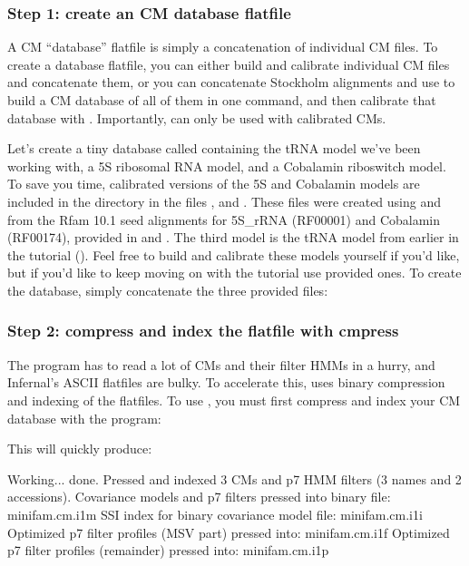 \subsubsection{Step 1: create an CM database flatfile}

A CM ``database'' flatfile is simply a concatenation of individual CM
files. To create a database flatfile, you can either build and
calibrate individual CM files and concatenate them, or you can
concatenate Stockholm alignments and use  to build a CM
database of all of them in one command, and then calibrate that
database with . Importantly,  can only
be used with calibrated CMs.

Let's create a tiny database called  containing the
tRNA model we've been working with, a 5S ribosomal RNA model, and a
Cobalamin riboswitch model. To save you time, calibrated versions of
the 5S and Cobalamin models are included in the 
directory in the files , and
. These files were created using 
and  from the Rfam 10.1 seed alignments for 5S\_rRNA
(RF00001) and Cobalamin (RF00174), provided in
 and . The
third model is the tRNA model from earlier in the tutorial
(). Feel free to build and calibrate these
models yourself if you'd like, but if you'd like to keep moving on
with the tutorial use provided ones. To create the database, simply
concatenate the three provided files:


\subsubsection{Step 2: compress and index the flatfile with cmpress}

The  program has to read a lot of CMs and their filter
HMMs in a hurry, and Infernal's ASCII flatfiles are bulky. To
accelerate this,  uses binary compression and indexing of
the flatfiles. To use , you must first compress and
index your CM database with the  program:


This will quickly produce:

\begin{sreoutput}
Working...    done.
Pressed and indexed 3 CMs and p7 HMM filters (3 names and 2 accessions).
Covariance models and p7 filters pressed into binary file:  minifam.cm.i1m
SSI index for binary covariance model file:                 minifam.cm.i1i
Optimized p7 filter profiles (MSV part)  pressed into:      minifam.cm.i1f
Optimized p7 filter profiles (remainder) pressed into:      minifam.cm.i1p
\end{sreoutput}

